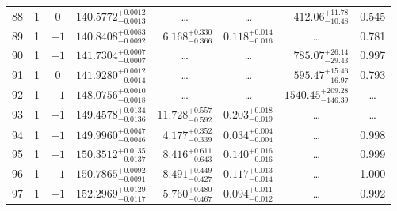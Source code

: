 \begin{table*}[!]
\begin{tabular}{llcrrlrc}
88 & 1 & 0 & $    140.5772_{-      0.0013}^{+      0.0012}$ & \multicolumn{1}{c}{\dots} & \multicolumn{1}{c}{\dots} & $      412.06_{-       10.48}^{+       11.78}$ & 0.545\\[1pt]
89 & 1 & $+1$ & $    140.8408_{-      0.0092}^{+      0.0083}$ & $       6.168_{-       0.366}^{+       0.330}$ & $       0.118_{-       0.016}^{+       0.014}$ & \multicolumn{1}{c}{\dots} & 0.781\\[1pt]
90 & 1 & $-1$ & $    141.7304_{-      0.0007}^{+      0.0007}$ & \multicolumn{1}{c}{\dots} & \multicolumn{1}{c}{\dots} & $      785.07_{-       29.43}^{+       26.14}$ & 0.997\\[1pt]
91 & 1 & 0 & $    141.9280_{-      0.0014}^{+      0.0012}$ & \multicolumn{1}{c}{\dots} & \multicolumn{1}{c}{\dots} & $      595.47_{-       16.97}^{+       15.46}$ & 0.793\\[1pt]

92 & 1 & $-1$ & $    148.0756_{-      0.0018}^{+      0.0010}$ & \multicolumn{1}{c}{\dots} & \multicolumn{1}{c}{\dots} & $     1540.45_{-      146.39}^{+      209.28}$ & \dots \\[1pt]
93 & 1 & $-1$ & $    149.4578_{-      0.0136}^{+      0.0134}$ & $      11.728_{-       0.592}^{+       0.557}$ & $       0.203_{-       0.019}^{+       0.018}$ & \multicolumn{1}{c}{\dots} & \dots \\[1pt]
94 & 1 & $+1$ & $    149.9960_{-      0.0046}^{+      0.0047}$ & $       4.177_{-       0.339}^{+       0.352}$ & $       0.034_{-       0.004}^{+       0.004}$ & \multicolumn{1}{c}{\dots} & 0.998 \\[1pt]
95 & 1 & $-1$ & $    150.3512_{-      0.0137}^{+      0.0135}$ & $       8.416_{-       0.643}^{+       0.611}$ & $       0.140_{-       0.016}^{+       0.016}$ & \multicolumn{1}{c}{\dots} & 0.999 \\[1pt]
96 & 1 & $+1$ & $    150.7865_{-      0.0091}^{+      0.0092}$ & $       8.491_{-       0.427}^{+       0.449}$ & $       0.117_{-       0.014}^{+       0.013}$ & \multicolumn{1}{c}{\dots} & 1.000 \\[1pt]
97 & 1 & $+1$ & $    152.2969_{-      0.0117}^{+      0.0129}$ & $       5.760_{-       0.467}^{+       0.480}$ & $       0.094_{-       0.012}^{+       0.011}$ & \multicolumn{1}{c}{\dots} & 0.992 \\[1pt]
\hline
\end{tabular}
\end{table*}



